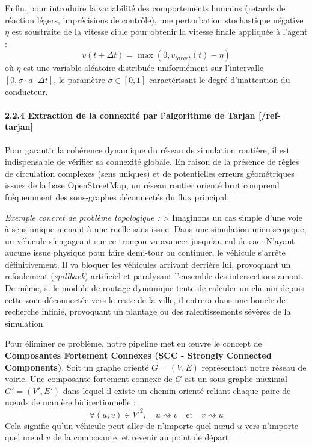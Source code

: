\documentclass[10pt, a4paper]{article}
\begin{document}
Enfin, pour introduire la variabilité des comportements humains (retards
de réaction légers, imprécisions de contrôle), une perturbation
stochastique négative \(\eta\) est soustraite de la vitesse cible pour
obtenir la vitesse finale appliquée à l'agent :
\[v(t + \Delta t) = \max\left( 0, v_{target}(t) - \eta \right)\] où
\(\eta\) est une variable aléatoire distribuée uniformément sur
l'intervalle \([0, \sigma \cdot a \cdot \Delta t]\), le paramètre
\(\sigma \in [0, 1]\) caractérisant le degré d'inattention du
conducteur.

\paragraph{2.2.4 Extraction de la connexité par l'algorithme de Tarjan
{[}/ref-tarjan{]}}\label{extraction-de-la-connexituxe9-par-lalgorithme-de-tarjan-ref-tarjan}

Pour garantir la cohérence dynamique du réseau de simulation routière,
il est indispensable de vérifier sa connexité globale. En raison de la
présence de règles de circulation complexes (sens uniques) et de
potentielles erreurs géométriques issues de la base OpenStreetMap, un
réseau routier orienté brut comprend fréquemment des sous-graphes
déconnectés du flux principal.

\emph{Exemple concret de problème topologique :} \textgreater{}
Imaginons un cas simple d'une voie à sens unique menant à une ruelle
sans issue. Dans une simulation microscopique, un véhicule s'engageant
sur ce tronçon va avancer jusqu'au cul-de-sac. N'ayant aucune issue
physique pour faire demi-tour ou continuer, le véhicule s'arrête
définitivement. Il va bloquer les véhicules arrivant derrière lui,
provoquant un refoulement (\emph{spillback}) artificiel et paralysant
l'ensemble des intersections amont. De même, si le module de routage
dynamique tente de calculer un chemin depuis cette zone déconnectée vers
le reste de la ville, il entrera dans une boucle de recherche infinie,
provoquant un plantage ou des ralentissements sévères de la simulation.

Pour éliminer ce problème, notre pipeline met en œuvre le concept de
\textbf{Composantes Fortement Connexes (SCC - Strongly Connected
Components)}. Soit un graphe orienté \(G = (V, E)\) représentant notre
réseau de voirie. Une composante fortement connexe de \(G\) est un
sous-graphe maximal \(G' = (V', E')\) dans lequel il existe un chemin
orienté reliant chaque paire de nœuds de manière bidirectionnelle :
\[\forall (u, v) \in V'^2, \quad u \rightsquigarrow v \quad \text{et} \quad v \rightsquigarrow u\]
Cela signifie qu'un véhicule peut aller de n'importe quel nœud \(u\)
vers n'importe quel nœud \(v\) de la composante, et revenir au point de
départ.
\end{document}

